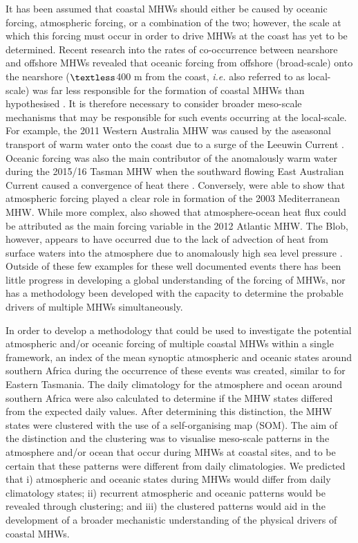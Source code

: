 \documentclass[utf8]{frontiersSCNS}
\begin{document}
It has been assumed that coastal MHWs should either be caused by oceanic forcing, atmospheric forcing, or a combination of the two; however, the scale at which this forcing must occur in order to drive MHWs at the coast has yet to be determined. Recent research into the rates of co-occurrence between nearshore and offshore MHWs revealed that oceanic forcing from offshore (broad-scale) onto the nearshore ($\textless$400 m from the coast, \emph{i.e.} also referred to as local-scale) was far less responsible for the formation of coastal MHWs than hypothesised \citep{Schlegel2017}. It is therefore necessary to consider broader meso-scale mechanisms that may be responsible for such events occurring at the local-scale. For example, the 2011 Western Australia MHW \citep{Pearce2013} was caused by the aseasonal transport of warm water onto the coast due to a surge of the Leeuwin Current \citep{Feng2013, Benthuysen2014}. Oceanic forcing was also the main contributor of the anomalously warm water during the 2015/16 Tasman MHW when the southward flowing East Australian Current caused a convergence of heat there \citep{Oliver2017}. Conversely, \citet{Garrabou2009} were able to show that atmospheric forcing played a clear role in formation of the 2003 Mediterranean MHW. While more complex, \citet{Chen2015a} also showed that atmosphere-ocean heat flux could be attributed as the main forcing variable in the 2012 Atlantic MHW. The Blob, however, appears to have occurred due to the lack of advection of heat from surface waters into the atmosphere due to anomalously high sea level pressure \citep{Bond2015a}. Outside of these few examples for these well documented events there has been little progress in developing a global understanding of the forcing of MHWs, nor has a methodology been developed with the capacity to determine the probable drivers of multiple MHWs simultaneously.

In order to develop a methodology that could be used to investigate the potential atmospheric and/or oceanic forcing of multiple coastal MHWs within a single framework, an index of the mean synoptic atmospheric and oceanic states around southern Africa during the occurrence of these events was created, similar to \citet{Oliver2017atlas} for Eastern Tasmania. The daily climatology for the atmosphere and ocean around southern Africa were also calculated to determine if the MHW states differed from the expected daily values. After determining this distinction, the MHW states were clustered with the use of a self-organising map (SOM). The aim of the distinction and the clustering was to visualise meso-scale patterns in the atmosphere and/or ocean that occur during MHWs at coastal sites, and to be certain that these patterns were different from daily climatologies. We predicted that i) atmospheric and oceanic states during MHWs would differ from daily climatology states; ii) recurrent atmospheric and oceanic patterns would be revealed through clustering; and iii) the clustered patterns would aid in the development of a broader mechanistic understanding of the physical drivers of coastal MHWs.
\end{document}
